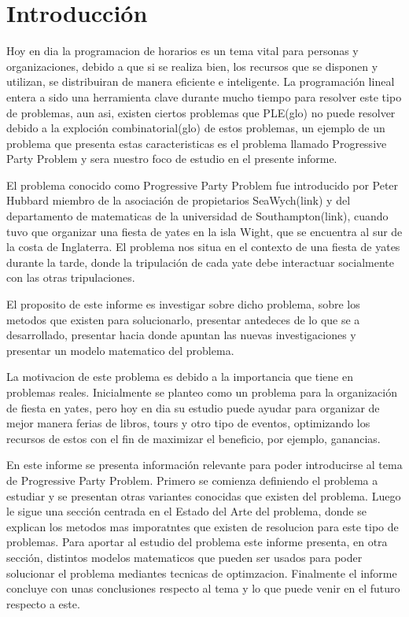 \documentclass[spanish, fleqn]{article}
\begin{document}
\section{Introducción}

Hoy en dia la programacion de horarios es un tema vital para personas y organizaciones, debido a que si se realiza bien, los recursos que se disponen y utilizan, se distribuiran de manera eficiente e inteligente. La programación lineal entera a sido una herramienta clave durante mucho tiempo para resolver este tipo de problemas, aun asi, existen ciertos problemas que PLE(glo) no puede resolver debido a la exploción combinatorial(glo) de estos problemas, un ejemplo de un problema que presenta estas caracteristicas es el problema llamado Progressive Party Problem y sera nuestro foco de estudio en el presente informe.

El problema conocido como Progressive Party Problem fue introducido por Peter Hubbard miembro de la asociación de propietarios SeaWych(link) y del departamento de matematicas de la universidad de Southampton(link), cuando tuvo que organizar una fiesta de yates en la isla Wight, que se encuentra al sur de la costa de Inglaterra. El problema nos situa en el contexto de una fiesta de yates durante la tarde, donde la tripulación de cada yate debe interactuar socialmente con las otras tripulaciones. 

El proposito de este informe es investigar sobre dicho problema, sobre los metodos que existen para solucionarlo, presentar antedeces de lo que se a desarrollado, presentar hacia donde apuntan las nuevas investigaciones y presentar un modelo matematico del problema.

La motivacion de este problema es debido a la importancia que tiene en problemas reales. Inicialmente se planteo como un problema para la organización de fiesta en yates, pero hoy en dia su estudio puede ayudar para organizar de mejor manera ferias de libros, tours y otro tipo de eventos, optimizando los recursos de estos con el fin de maximizar el beneficio, por ejemplo, ganancias.

En este informe se presenta información relevante para poder introducirse al tema de Progressive Party Problem. Primero se comienza definiendo el problema a estudiar y se presentan otras variantes conocidas que existen del problema. Luego le sigue una sección centrada en el Estado del Arte del problema, donde se explican los metodos mas imporatntes que existen de resolucion para este tipo de problemas. Para aportar al estudio del problema este informe presenta, en otra sección, distintos modelos matematicos que pueden ser usados para poder solucionar el problema mediantes tecnicas de optimzacion. Finalmente el informe concluye con unas conclusiones respecto al tema y lo que puede venir en el futuro respecto a este.
\end{document}
